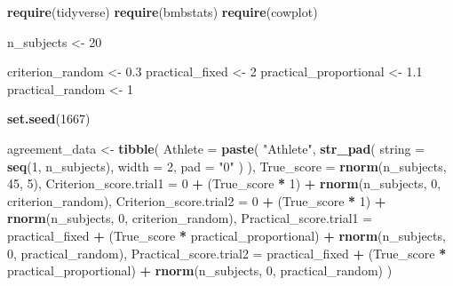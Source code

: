 \documentclass[
]{book}
\newenvironment{Shaded}{\begin{snugshade}}{\end{snugshade}}
\newcommand{\DataTypeTok}[1]{\textcolor[rgb]{0.13,0.29,0.53}{#1}}
\newcommand{\DecValTok}[1]{\textcolor[rgb]{0.00,0.00,0.81}{#1}}
\newcommand{\FloatTok}[1]{\textcolor[rgb]{0.00,0.00,0.81}{#1}}
\newcommand{\KeywordTok}[1]{\textcolor[rgb]{0.13,0.29,0.53}{\textbf{#1}}}
\newcommand{\NormalTok}[1]{#1}
\newcommand{\OperatorTok}[1]{\textcolor[rgb]{0.81,0.36,0.00}{\textbf{#1}}}
\newcommand{\StringTok}[1]{\textcolor[rgb]{0.31,0.60,0.02}{#1}}
\begin{document}
\begin{Shaded}
\begin{Highlighting}[]
\KeywordTok{require}\NormalTok{(tidyverse)}
\KeywordTok{require}\NormalTok{(bmbstats)}
\KeywordTok{require}\NormalTok{(cowplot)}

\NormalTok{n\_subjects <{-}}\StringTok{ }\DecValTok{20}

\NormalTok{criterion\_random <{-}}\StringTok{ }\FloatTok{0.3}
\NormalTok{practical\_fixed <{-}}\StringTok{ }\DecValTok{2}
\NormalTok{practical\_proportional <{-}}\StringTok{ }\FloatTok{1.1}
\NormalTok{practical\_random <{-}}\StringTok{ }\DecValTok{1}

\KeywordTok{set.seed}\NormalTok{(}\DecValTok{1667}\NormalTok{)}

\NormalTok{agreement\_data <{-}}\StringTok{ }\KeywordTok{tibble}\NormalTok{(}
  \DataTypeTok{Athlete =} \KeywordTok{paste}\NormalTok{(}
    \StringTok{"Athlete"}\NormalTok{,}
    \KeywordTok{str\_pad}\NormalTok{(}
      \DataTypeTok{string =} \KeywordTok{seq}\NormalTok{(}\DecValTok{1}\NormalTok{, n\_subjects),}
      \DataTypeTok{width =} \DecValTok{2}\NormalTok{,}
      \DataTypeTok{pad =} \StringTok{"0"}
\NormalTok{    )}
\NormalTok{  ),}
  \DataTypeTok{True\_score =} \KeywordTok{rnorm}\NormalTok{(n\_subjects, }\DecValTok{45}\NormalTok{, }\DecValTok{5}\NormalTok{),}
  \DataTypeTok{Criterion\_score.trial1 =} \DecValTok{0} \OperatorTok{+}\StringTok{ }\NormalTok{(True\_score }\OperatorTok{*}\StringTok{ }\DecValTok{1}\NormalTok{) }\OperatorTok{+}\StringTok{ }\KeywordTok{rnorm}\NormalTok{(n\_subjects, }\DecValTok{0}\NormalTok{, criterion\_random),}
  \DataTypeTok{Criterion\_score.trial2 =} \DecValTok{0} \OperatorTok{+}\StringTok{ }\NormalTok{(True\_score }\OperatorTok{*}\StringTok{ }\DecValTok{1}\NormalTok{) }\OperatorTok{+}\StringTok{ }\KeywordTok{rnorm}\NormalTok{(n\_subjects, }\DecValTok{0}\NormalTok{, criterion\_random),}
  \DataTypeTok{Practical\_score.trial1 =}\NormalTok{ practical\_fixed }\OperatorTok{+}\StringTok{ }\NormalTok{(True\_score }\OperatorTok{*}\StringTok{ }\NormalTok{practical\_proportional) }\OperatorTok{+}\StringTok{ }\KeywordTok{rnorm}\NormalTok{(n\_subjects, }\DecValTok{0}\NormalTok{, practical\_random),}
  \DataTypeTok{Practical\_score.trial2 =}\NormalTok{ practical\_fixed }\OperatorTok{+}\StringTok{ }\NormalTok{(True\_score }\OperatorTok{*}\StringTok{ }\NormalTok{practical\_proportional) }\OperatorTok{+}\StringTok{ }\KeywordTok{rnorm}\NormalTok{(n\_subjects, }\DecValTok{0}\NormalTok{, practical\_random)}
\NormalTok{)}


\end{Highlighting}
\end{Shaded}
\end{document}
